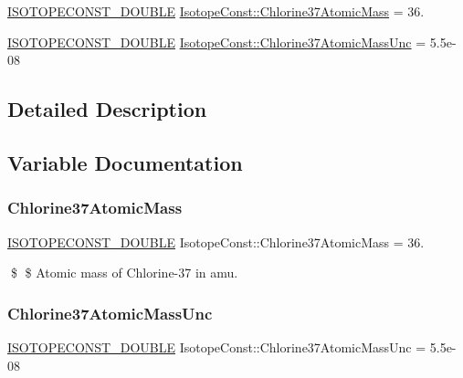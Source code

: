\begin{DoxyCompactItemize}
\item 
\mbox{\hyperlink{group___isotope_const-_macros_ga8f45a7272ce02c0b4c65c44636ed719a}{I\+S\+O\+T\+O\+P\+E\+C\+O\+N\+S\+T\+\_\+\+D\+O\+U\+B\+LE}} \mbox{\hyperlink{group___isotope_const-_chlorine-_cl37_ga8da3f9ef0584307b0ba0ec87d78eac75}{Isotope\+Const\+::\+Chlorine37\+Atomic\+Mass}} = 36.
\item 
\mbox{\hyperlink{group___isotope_const-_macros_ga8f45a7272ce02c0b4c65c44636ed719a}{I\+S\+O\+T\+O\+P\+E\+C\+O\+N\+S\+T\+\_\+\+D\+O\+U\+B\+LE}} \mbox{\hyperlink{group___isotope_const-_chlorine-_cl37_ga3575af4c3f6e75fceadfc66320f41f7a}{Isotope\+Const\+::\+Chlorine37\+Atomic\+Mass\+Unc}} = 5.\+5e-\/08
\end{DoxyCompactItemize}


\subsection{Detailed Description}


\subsection{Variable Documentation}
\mbox{\label{group___isotope_const-_chlorine-_cl37_ga8da3f9ef0584307b0ba0ec87d78eac75}} 
\subsubsection{\texorpdfstring{Chlorine37\+Atomic\+Mass}{Chlorine37AtomicMass}}
{\footnotesize\ttfamily \mbox{\hyperlink{group___isotope_const-_macros_ga8f45a7272ce02c0b4c65c44636ed719a}{I\+S\+O\+T\+O\+P\+E\+C\+O\+N\+S\+T\+\_\+\+D\+O\+U\+B\+LE}} Isotope\+Const\+::\+Chlorine37\+Atomic\+Mass = 36.}

\$ \$ Atomic mass of Chlorine-\/37 in amu. \mbox{\label{group___isotope_const-_chlorine-_cl37_ga3575af4c3f6e75fceadfc66320f41f7a}} 
\subsubsection{\texorpdfstring{Chlorine37\+Atomic\+Mass\+Unc}{Chlorine37AtomicMassUnc}}
{\footnotesize\ttfamily \mbox{\hyperlink{group___isotope_const-_macros_ga8f45a7272ce02c0b4c65c44636ed719a}{I\+S\+O\+T\+O\+P\+E\+C\+O\+N\+S\+T\+\_\+\+D\+O\+U\+B\+LE}} Isotope\+Const\+::\+Chlorine37\+Atomic\+Mass\+Unc = 5.\+5e-\/08}

